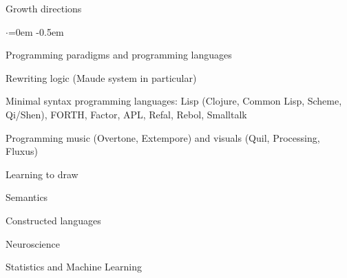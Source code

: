 \documentclass{resume} %
\begin{document}

\begin{rSection}{Growth directions}
  \smallskip
  \begin{list}{$\cdot$}{\leftmargin=0em} %
    \itemsep -0.5em \vspace{-0.5em} %
  \item Programming paradigms and programming languages
  \item Rewriting logic (Maude system in particular)
  \item Minimal syntax programming languages: Lisp (Clojure, Common Lisp, Scheme,
        Qi/Shen), FORTH, Factor, APL, Refal, Rebol, Smalltalk
  \item Programming music (Overtone, Extempore) and visuals (Quil, Processing, Fluxus)
  \item Learning to draw
  \item Semantics
  \item Constructed languages
  \item Neuroscience
  \item Statistics and Machine Learning
  \end{list}
\end{rSection}

\end{document}
